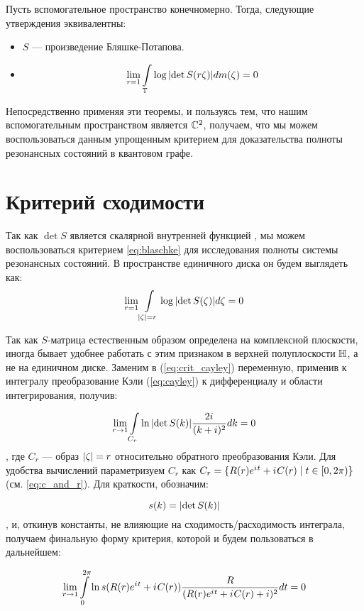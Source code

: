 \begin{theorem}
Пусть вспомогательное пространство конечномерно. Тогда, следующие утверждения эквивалентны:
\begin{itemize}
\item $S$ — произведение Бляшке-Потапова.
\item
\begin{equation}\label{eq:blaschke}
\lim\limits_{r = 1} \int\limits_{\mathbb{T}} \log \abs{\det S(r \zeta)} d m(\zeta) = 0
\end{equation}
\end{itemize}
\end{theorem}
Непосредственно применяя эти теоремы, и пользуясь тем, что нашим вспомогательным пространством является $\mathbb{C}^2$, получаем, что мы можем воспользоваться данным упрощенным критерием для доказательства полноты резонансных состояний в квантовом графе.

\section{Критерий сходимости}

Так как $\det S$ является скалярной внутренней функцией \cite{nikol2012treatise}, мы можем воспользоваться критерием \ref{eq:blaschke} для исследования полноты системы резонансных состояний. В пространстве единичного диска он будем выглядеть как:
\begin{equation}\label{eq:crit_cayley}
\lim\limits_{r = 1} \int\limits_{\abs{\zeta} = r} \log \abs{\det S(\zeta)} d \zeta = 0
\end{equation}

Так как $S$-матрица естественным образом определена на комплексной плоскости, иногда бывает удобнее работать с этим признаком в верхней полуплоскости $\mathbb{H}$, а не на единичном диске. Заменим в (\ref{eq:crit_cayley}) переменную, применив к интегралу преобразование Кэли (\ref{eq:cayley}) к дифференциалу и области интегрирования, получив:

\begin{equation}\label{eq:crit}
\lim\limits_{r \to 1} \int\limits_{C_r} \ln \abs{\det S(k)} \frac{2 {i\mkern1mu}}{(k + i)^2} dk = 0
\end{equation}
, где $C_r$ — образ $\abs{\zeta} = r$ относительно обратного преобразования Кэли. Для удобства вычислений параметризуем $C_r$ как $C_r = \{R(r) e^{{i\mkern1mu} t} + {i\mkern1mu} C(r) \mid t \in [0, 2 \pi)\}$ (см. \ref{eq:c_and_r}). Для краткости, обозначим:

\[
s(k) = \abs{\det S(k)}
\]
, и, откинув константы, не влияющие на сходимость/расходимость интеграла, получаем финальную форму критерия, которой и будем пользоваться в дальнейшем:

\begin{equation}\label{eq:critp}
\lim\limits_{r \to 1} \int\limits_{0}^{2 \pi} \ln s(R(r) e^{{i\mkern1mu} t} + {i\mkern1mu} C(r)) \frac{R}{(R(r) e^{{i\mkern1mu} t} + {i\mkern1mu} C(r) + i)^2} dt = 0
\end{equation}
